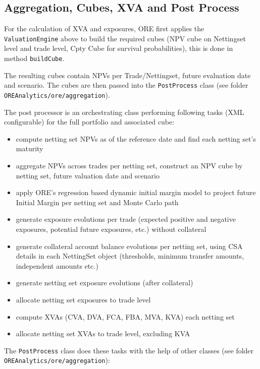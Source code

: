 \documentclass[12pt, a4paper]{article}
\begin{document}
\subsection{Aggregation, Cubes, XVA and Post Process}
For the calculation of XVA and exposures, ORE first applies the {\tt ValuationEngine} above to build the required cubes (NPV cube on Nettingset level and trade level, Cpty Cube for survival probabilities), this is done in method {\tt buildCube}.

The resulting cubes contain NPVs per Trade/Nettingset, future evaluation date and scenario. The cubes are then passed into the {\tt PostProcess} class (see folder {\tt OREAnalytics/ore/aggregation}).

The post processor is an orchestrating class performing following tasks (XML configurable) for the full portfolio and associated cube:
\begin{itemize}
\item compute netting set NPVs as of the reference date and find each netting set's maturity
\item aggregate NPVs across trades per netting set, construct an NPV cube by netting set, future valuation date and scenario
\item apply ORE's regression based dynamic initial margin model to project future Initial Margin per netting set and Monte Carlo path
\item generate exposure evolutions per trade (expected positive and negative exposures, potential future exposures, etc.) without collateral
\item generate collateral account balance evolutions per netting set, using CSA details in each NettingSet object (thresholds, minimum transfer amounts, independent amounts etc.)
\item generate netting set exposure evolutions (after collateral)
\item allocate netting set exposures to trade level
\item compute XVAs (CVA, DVA, FCA, FBA, MVA, KVA) each netting set
\item allocate netting set XVAs to trade level, excluding KVA
\end{itemize}

The {\tt PostProcess} class does these tasks with the help of other classes (see folder {\tt OREAnalytics/ore/aggregation}):
\end{document}
